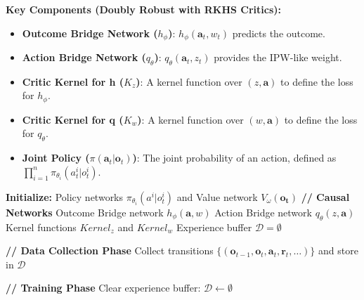 \documentclass{article}
\begin{document}
\textbf{Key Components (Doubly Robust with RKHS Critics):}
\begin{itemize}
    \item \textbf{Outcome Bridge Network ($h_\phi$)}: $h_\phi(\mathbf{a}_t, w_t)$ predicts the outcome.
    \item \textbf{Action Bridge Network ($q_\theta$)}: $q_\theta(\mathbf{a}_t, z_t)$ provides the IPW-like weight.
    \item \textbf{Critic Kernel for h ($K_z$)}: A kernel function over $(z, \mathbf{a})$ to define the loss for $h_\phi$.
    \item \textbf{Critic Kernel for q ($K_w$)}: A kernel function over $(w, \mathbf{a})$ to define the loss for $q_\theta$.
    \item \textbf{Joint Policy ($\pi(\mathbf{a}_t|\mathbf{o}_t)$)}: The joint probability of an action, defined as $\prod_{i=1}^n \pi_{\theta_i}(a^i_t | o^i_t)$.
\end{itemize}

\begin{algorithm}
\caption{PCI-MAPPO: Main Training Loop (DR with RKHS Critics)}
\label{alg:pci-mappo-dr-rkhs-main}
\begin{algorithmic}[1]
\State \textbf{Initialize:}
\State \quad Policy networks $\pi_{\theta_i}(a^i | o^i_t)$ and Value network $V_{\omega}(\mathbf{o_t})$
\State \quad \textbf{// Causal Networks}
\State \quad Outcome Bridge network $h_\phi(\mathbf{a}, w)$
\State \quad Action Bridge network $q_\theta(z, \mathbf{a})$
\State \quad Kernel functions $Kernel_z$ and $Kernel_w$
\State \quad Experience buffer $\mathcal{D} = \emptyset$

    \State \textbf{// Data Collection Phase}
    \State Collect transitions $\{(\mathbf{o}_{t-1}, \mathbf{o}_t, \mathbf{a}_t, \mathbf{r}_t, \ldots)\}$ and store in $\mathcal{D}$
    
    \State \textbf{// Training Phase}
        \State {}
        \State {}
    \EndFor
    \State Clear experience buffer: $\mathcal{D} \leftarrow \emptyset$
\EndFor
\end{algorithmic}
\end{algorithm}

\newpage
\end{document}
